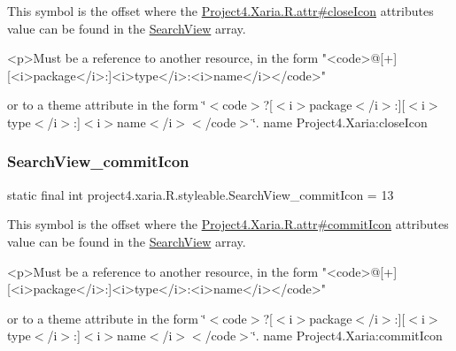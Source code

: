 This symbol is the offset where the \hyperlink{}{Project4.\+Xaria.\+R.\+attr\#close\+Icon} attribute\textquotesingle{}s value can be found in the \hyperlink{classproject4_1_1xaria_1_1R_1_1styleable_a6308d960f6e1e05e5316efa4904fedfc}{Search\+View} array.

\begin{DoxyVerb}      <p>Must be a reference to another resource, in the form "<code>@[+][<i>package</i>:]<i>type</i>:<i>name</i></code>"
\end{DoxyVerb}
 or to a theme attribute in the form \char`\"{}$<$code$>$?\mbox{[}$<$i$>$package$<$/i$>$\+:\mbox{]}\mbox{[}$<$i$>$type$<$/i$>$\+:\mbox{]}$<$i$>$name$<$/i$>$$<$/code$>$\char`\"{}.  name Project4.\+Xaria\+:close\+Icon \mbox{\label{classproject4_1_1xaria_1_1R_1_1styleable_a63519a27d7991d2eae6ff9cf06953242}} 
\subsubsection{\texorpdfstring{Search\+View\+\_\+commit\+Icon}{SearchView\_commitIcon}}
{\footnotesize\ttfamily static final int project4.\+xaria.\+R.\+styleable.\+Search\+View\+\_\+commit\+Icon = 13\hspace{0.3cm}{\ttfamily [static]}}

This symbol is the offset where the \hyperlink{}{Project4.\+Xaria.\+R.\+attr\#commit\+Icon} attribute\textquotesingle{}s value can be found in the \hyperlink{classproject4_1_1xaria_1_1R_1_1styleable_a6308d960f6e1e05e5316efa4904fedfc}{Search\+View} array.

\begin{DoxyVerb}      <p>Must be a reference to another resource, in the form "<code>@[+][<i>package</i>:]<i>type</i>:<i>name</i></code>"
\end{DoxyVerb}
 or to a theme attribute in the form \char`\"{}$<$code$>$?\mbox{[}$<$i$>$package$<$/i$>$\+:\mbox{]}\mbox{[}$<$i$>$type$<$/i$>$\+:\mbox{]}$<$i$>$name$<$/i$>$$<$/code$>$\char`\"{}.  name Project4.\+Xaria\+:commit\+Icon \mbox{\label{classproject4_1_1xaria_1_1R_1_1styleable_a2e66e2926f9bd975328f388c70fde340}} 
